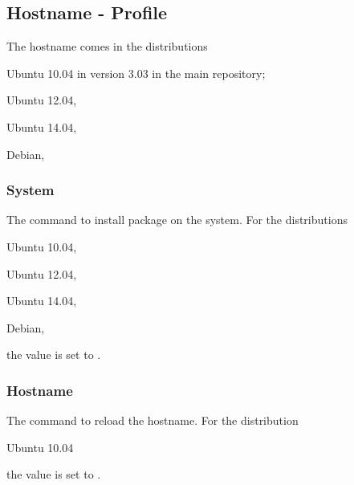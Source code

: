 \subsection{Hostname - Profile}

The hostname comes in the distributions 
\begin{compactitem}
\item[\TheDistribution{ubuntu}] Ubuntu 10.04 in version 3.03 in the main repository;
\item[\TheDistribution{ubuntu}] Ubuntu 12.04,
\item[\TheDistribution{ubuntu}] Ubuntu 14.04,
\item[\TheDistribution{debian}] Debian,
\end{compactitem}

\subsubsection*{System}


The command to install package on the system.
For the distributions 
\begin{inparaitem}
\item[\TheDistribution{ubuntu}] Ubuntu 10.04,
\item[\TheDistribution{ubuntu}] Ubuntu 12.04,
\item[\TheDistribution{ubuntu}] Ubuntu 14.04,
\item[\TheDistribution{debian}] Debian,
\end{inparaitem}
the value is set to .

\subsubsection*{Hostname}


The command to reload the hostname.
For the distribution
\begin{inparaitem}
\item[\TheDistribution{ubuntu}] Ubuntu 10.04
\end{inparaitem}
the value is set to .

